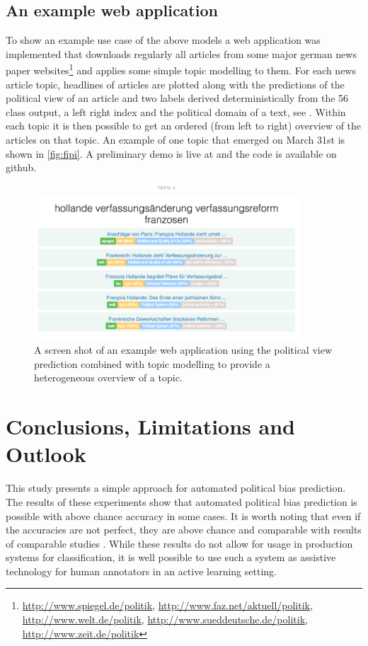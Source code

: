 \documentclass{article}
\begin{document}
\subsection{An example web application}
To show an example use case of the above models a web application was implemented that downloads regularly all articles from some major german news paper websites\footnote{\url{http://www.spiegel.de/politik}, \url{http://www.faz.net/aktuell/politik}, \url{http://www.welt.de/politik}, \url{http://www.sueddeutsche.de/politik}, \url{http://www.zeit.de/politik}} and applies some simple topic modelling to them. For each news article topic, headlines of articles are plotted along with the predictions of the political view of an article and two labels derived deterministically from the 56 class output, a left right index and the political domain of a text, see \cite{leftright}. Within each topic it is then possible to get an ordered (from left to right) overview of the articles on that topic. An example of one topic that emerged on March 31st is shown in \autoref{fig:fipi}. A preliminary demo is live at \cite{fipidemo} and the code is available on github\cite{fipi}.
\begin{figure}
\begin{center}
\includegraphics[width=10cm]{images/fipi-screenshot}
%
\end{center}
\caption{
\label{fig:fipi}
A screen shot of an example web application using the political view prediction combined with topic modelling to provide a heterogeneous overview of a topic. }
\end{figure}


\section{Conclusions, Limitations and Outlook}\label{sec:conclusion}
This study presents a simple approach for automated political bias prediction. The results of these experiments show that automated political bias prediction is possible with above chance accuracy in some cases. It is worth noting that even if the accuracies are not perfect, they are above chance and comparable with results of comparable studies \cite{Yu2008, Hirst2014}. While these results do not allow for usage in production systems for classification, it is well possible to use such a system as assistive technology for human annotators in an active learning setting.
\end{document}

